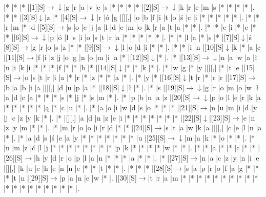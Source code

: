\documentclass[11pt]{article}
\newcommand\drarr{$\rightarrow \!\!\!\!\! \downarrow$}
\newcommand\rarr{$\rightarrow$}
\newcommand\darr{$\downarrow$}
\begin{document}
\noindent\begin{Puzzle}{23}{19}|*	|*	|*	|[1][S]\drarr	|g	|r	|a	|v	|e	|s	|*	|*	|*	|*	|[2][S]\drarr	|k	|r	|e	|m	|s	|*	|*	|*	|*	|.
|*	|*	|[3][S]\darr	|z	|*	|[4][S]\drarr	|r	|ó	|g	|[][,]{ }	|o	|b	|f	|i	|t	|o	|ś	|c	|i	|*	|*	|*	|*	|*	|.
|*	|*	|r	|m	|*	|d	|[5][S]\rarr	|s	|o	|c	|j	|a	|l	|d	|e	|m	|o	|k	|r	|a	|t	|a	|*	|*	|.
|*	|*	|e	|i	|*	|e	|*	|*	|[6][S]\drarr	|p	|ó	|ł	|s	|i	|o	|s	|t	|r	|a	|*	|*	|*	|*	|*	|.
|*	|*	|l	|a	|*	|s	|*	|[7][S]\darr	|ś	|[8][S]\rarr	|g	|r	|o	|s	|z	|*	|*	|[9][S]\drarr	|l	|o	|d	|i	|*	|*	|.
|*	|*	|i	|n	|[10][S]\darr	|k	|*	|a	|c	|[11][S]\rarr	|f	|i	|z	|j	|o	|g	|n	|o	|m	|i	|a	|*	|[12][S]\darr	|*	|.
|*	|[13][S]\drarr	|n	|a	|w	|a	|ł	|n	|i	|k	|i	|*	|*	|*	|f	|*	|*	|b	|*	|[14][S]\darr	|*	|*	|k	|*	|.
|*	|w	|g	|*	|y	|[][,]{ }	|*	|t	|e	|[15][S]\rarr	|o	|s	|t	|r	|i	|a	|*	|r	|*	|z	|*	|*	|a	|*	|.
|*	|y	|*	|[16][S]\darr	|t	|r	|*	|r	|r	|[17][S]\rarr	|b	|a	|b	|i	|a	|[][,]{ }	|d	|u	|p	|a	|*	|[18][S]\darr	|ł	|*	|.
|*	|s	|[19][S]\drarr	|g	|r	|o	|m	|o	|w	|ł	|a	|d	|c	|a	|*	|*	|*	|s	|*	|j	|*	|s	|m	|*	|.
|*	|p	|b	|n	|a	|z	|[20][S]\drarr	|p	|o	|l	|e	|r	|k	|a	|*	|*	|*	|*	|*	|ą	|*	|c	|u	|*	|.
|*	|a	|o	|i	|w	|d	|s	|o	|*	|*	|*	|[21][S]\rarr	|n	|u	|m	|i	|d	|y	|j	|c	|z	|y	|k	|*	|.
|*	|[][,]{ }	|a	|d	|n	|z	|e	|i	|*	|*	|*	|*	|*	|*	|*	|[22][S]\darr	|[23][S]\rarr	|e	|n	|z	|y	|m	|*	|*	|.
|*	|m	|r	|o	|o	|i	|r	|d	|*	|*	|[24][S]\rarr	|s	|t	|a	|w	|k	|a	|[][,]{ }	|c	|e	|l	|n	|a	|*	|.
|*	|a	|d	|s	|ś	|e	|a	|y	|*	|*	|*	|*	|*	|*	|*	|u	|[25][S]\drarr	|m	|a	|k	|*	|o	|*	|*	|.
|*	|n	|m	|z	|ć	|l	|j	|*	|*	|*	|*	|*	|*	|*	|*	|p	|k	|*	|*	|*	|*	|w	|*	|*	|.
|*	|*	|a	|*	|*	|c	|*	|*	|[26][S]\rarr	|h	|y	|d	|r	|o	|p	|l	|a	|n	|*	|*	|*	|a	|*	|*	|.
|*	|[27][S]\rarr	|n	|a	|c	|z	|y	|n	|i	|e	|[][,]{ }	|k	|u	|c	|h	|e	|n	|n	|e	|*	|*	|t	|*	|*	|.
|*	|*	|*	|[28][S]\rarr	|s	|a	|p	|r	|o	|f	|a	|g	|*	|*	|*	|t	|n	|[29][S]\rarr	|p	|a	|n	|e	|w	|*	|.
|[30][S]\rarr	|t	|r	|a	|m	|*	|*	|*	|*	|*	|*	|*	|*	|*	|*	|*	|*	|*	|*	|*	|*	|*	|*	|*	|.\end{Puzzle}

\newpage
\end{document}
